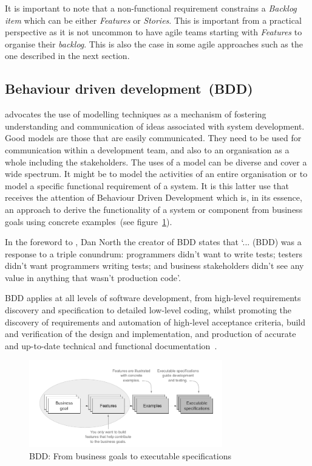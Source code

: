 \documentclass[dissertation,final]{softeng}
\begin{document}
It is important to note that a non-functional requirement constrains a \emph{Backlog item} which can be either \emph{Features} or \emph{Stories}. This is important from a practical perspective as it is not uncommon to have agile teams starting with \emph{Features} to organise their \emph{backlog}. This is also the case in some agile approaches such as the one described in the next section.

\subsection{Behaviour driven development~(BDD)}
\label{ch:Background:sec:bdd}
\citet{Hull2011} advocates the use of modelling techniques as a mechanism of fostering understanding and communication of ideas associated with system development. Good models are those that are easily communicated. They need to be used for communication within a development team, and also to an organisation as a whole including the stakeholders. The uses of a model can be diverse and cover a wide spectrum. It might be to model the activities of an entire organisation or to model a specific functional requirement of a system. It is this latter use that receives the attention of Behaviour Driven Development which is, in its essence, an approach to derive the functionality of a system or component from business goals using concrete examples~(see figure~\ref{fig:bdd_from_goals_to_specs}).

In the foreword to \citet{Smart201410}, Dan North the creator of BDD states that `... (BDD) was a response to a triple conundrum: programmers didn't want to write tests; testers didn't want programmers writing tests; and business stakeholders didn't see any value in anything that wasn't production code'.

BDD applies at all levels of software development, from high-level requirements discovery and specification to detailed low-level coding, whilst promoting the discovery of requirements and automation of high-level acceptance criteria, build and verification of the design and implementation, and production of accurate and up-to-date technical and functional documentation~\citep{Smart201410}.

\begin{figure}[h]
\includegraphics[width=0.75\textwidth]{BDD}
\centering
\caption[From business goals to executable specifications]{BDD: From business goals to executable specifications~\citep{Smart201410}}
\label{fig:bdd_from_goals_to_specs}
\end{figure}
\end{document}
